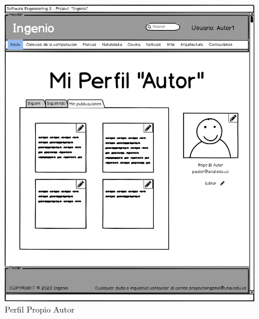 \documentclass[a4paper,12 pt]{article}
\begin{document}
\begin{figure}[H]
    \centering
    \includegraphics[scale = 0.71]{images/PerfilPropioAutor.jpg}
    \caption{Perfil Propio Autor}
    \label{F107}
\end{figure}{}
\end{document}
